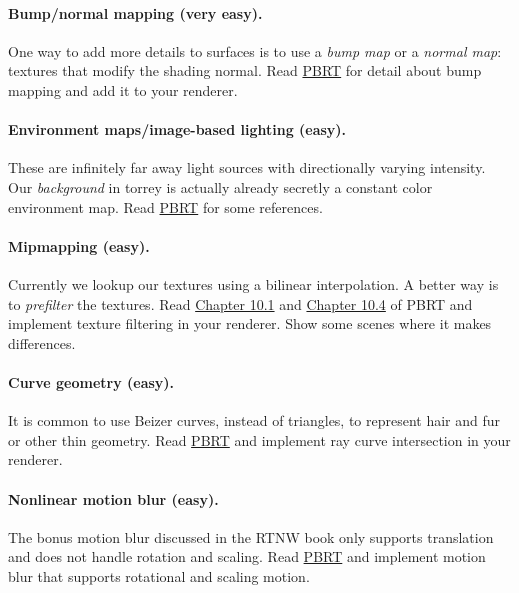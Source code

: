 \paragraph{Bump/normal mapping (very easy).}
One way to add more details to surfaces is to use a \emph{bump map} or a \emph{normal map}: textures that modify the shading normal. Read \href{https://www.pbr-book.org/3ed-2018/Materials/Bump_Mapping}{PBRT} for detail about bump mapping and add it to your renderer.

\paragraph{Environment maps/image-based lighting (easy).}
These are infinitely far away light sources with directionally varying intensity. Our \emph{background} in torrey is actually already secretly a constant color environment map. Read \href{https://www.pbr-book.org/3ed-2018/Light_Sources/Infinite_Area_Lights}{PBRT} for some references. 

\paragraph{Mipmapping (easy).}
Currently we lookup our textures using a bilinear interpolation. A better way is to \emph{prefilter} the textures. Read \href{https://www.pbr-book.org/3ed-2018/Texture/Sampling_and_Antialiasing.html}{Chapter 10.1} and \href{https://www.pbr-book.org/3ed-2018/Texture/Image_Texture}{Chapter 10.4} of PBRT and implement texture filtering in your renderer. Show some scenes where it makes differences.

\paragraph{Curve geometry (easy).}
It is common to use Beizer curves, instead of triangles, to represent hair and fur or other thin geometry. Read \href{https://www.pbr-book.org/3ed-2018/Shapes/Curves}{PBRT} and implement ray curve intersection in your renderer.

\paragraph{Nonlinear motion blur (easy).}
The bonus motion blur discussed in the RTNW book only supports translation and does not handle rotation and scaling. Read \href{https://www.pbr-book.org/3ed-2018/Geometry_and_Transformations/Animating_Transformations}{PBRT} and implement motion blur that supports rotational and scaling motion.

